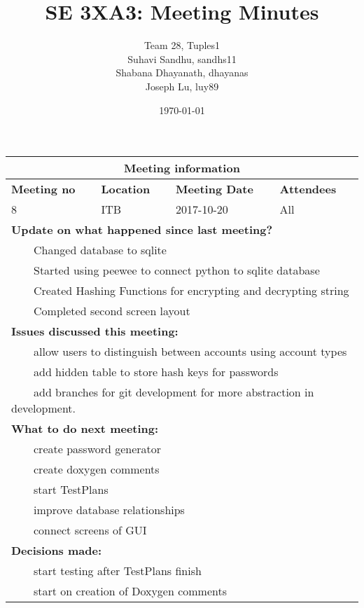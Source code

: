 \documentclass{article}
\title{SE 3XA3: Meeting Minutes}
\author{Team 28, Tuples1
		\\ Suhavi Sandhu, sandhs11
		\\ Shabana Dhayanath, dhayanas
		\\ Joseph Lu, luy89
}
\date{\today}
\newcommand{\tabitem}{~~\llap{\textbullet}~~}
\begin{document}
\begin{tabularx}{\textwidth}{| X || X || X || X |}
    \hline
    \hline
    \multicolumn{4}{|c|}{\textbf{Meeting information}}\\
    \hline
    \hline
        
    \textbf{Meeting no}& \textbf{Location}&\textbf{Meeting Date}&\textbf{Attendees}\\
    
    \hline

    8 & ITB & 2017-10-20 & All\\
    
    \hline

    \multicolumn{4}{|l|}{\textbf{Update on what happened since last meeting?}}\\

    \multicolumn{4}{|l|}{\tabitem Changed database to sqlite}\\
    \multicolumn{4}{|l|}{\tabitem Started using peewee to connect python to sqlite database}\\
    \multicolumn{4}{|l|}{\tabitem Created Hashing Functions for encrypting and decrypting string}\\
    \multicolumn{4}{|l|}{\tabitem Completed second screen layout}\\

    \hline

    \multicolumn{4}{|l|}{\textbf{Issues discussed this meeting:}}\\
    
    \multicolumn{4}{|l|}{\tabitem allow users to distinguish between accounts using account types}\\
    \multicolumn{4}{|l|}{\tabitem add hidden table to store hash keys for passwords}\\
    \multicolumn{4}{|l|}{\tabitem add branches for git development for more abstraction in development.}\\

    \hline

    \multicolumn{4}{|l|}{\textbf{What to do next meeting:}}\\

    \multicolumn{4}{|l|}{\tabitem create password generator}\\
    \multicolumn{4}{|l|}{\tabitem create doxygen comments}\\
    \multicolumn{4}{|l|}{\tabitem start TestPlans}\\
    \multicolumn{4}{|l|}{\tabitem improve database relationships}\\
    \multicolumn{4}{|l|}{\tabitem connect screens of GUI}\\

    \hline

    \multicolumn{4}{|l|}{\textbf{Decisions made:}}\\
    
    \multicolumn{4}{|l|}{\tabitem start testing after TestPlans finish}\\
    \multicolumn{4}{|l|}{\tabitem start on creation of Doxygen comments}\\

    \hline


\end{tabularx}
\end{document}
